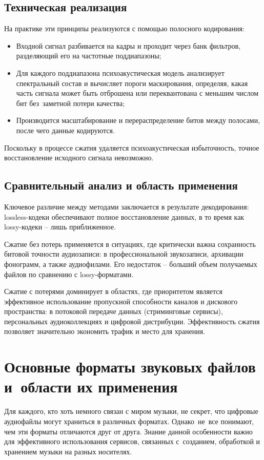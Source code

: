 \documentclass{ou}
\begin{document}
\subsection{Техническая реализация}
На практике эти принципы реализуются с помощью полосного кодирования:
\begin{itemize}[label=-, leftmargin=0em, itemindent=3.35em, nosep]
\item Входной сигнал разбивается на кадры и проходит через банк фильтров, разделяющий его на частотные поддиапазоны;
\item Для каждого поддиапазона психоакустическая модель анализирует спектральный состав и вычисляет пороги маскирования, определяя, какая часть сигнала может быть отброшена или переквантована с меньшим числом бит без~заметной потери качества;
\item Производится масштабирование и перераспределение битов между полосами, после чего данные кодируются.
\end{itemize}

Поскольку в процессе сжатия удаляется психоакустическая избыточность, точное восстановление исходного сигнала невозможно.

\subsection{Сравнительный анализ и область применения}

Ключевое различие между методами заключается в результате декодирования: lossless-кодеки обеспечивают полное восстановление данных, в то время как lossy-кодеки -- лишь приближенное.


Сжатие без потерь применяется в ситуациях, где критически важна сохранность битовой точности аудиозаписи: в профессиональной звукозаписи, архивации фонограмм, а также аудиофилами. Его недостаток -- больший объем получаемых файлов по сравнению с lossy-форматами.

Сжатие с потерями доминирует в областях, где приоритетом является эффективное использование пропускной способности каналов и дискового пространства: в потоковой передаче данных (стриминговые сервисы), персональных аудиоколлекциях и цифровой дистрибуции. Эффективность сжатия позволяет значительно экономить трафик и место для хранения.
\newpage
\section{Основные форматы звуковых файлов и~области их применения}
Для каждого, кто хоть немного связан с миром музыки, не секрет, что цифровые аудиофайлы могут храниться в различных форматах. Однако~не~все понимают, чем эти форматы отличаются друг от друга. Знание данной особенности важно для эффективного использования сервисов, связанных с~созданием, обработкой и хранением музыки на разных носителях.
\end{document}
